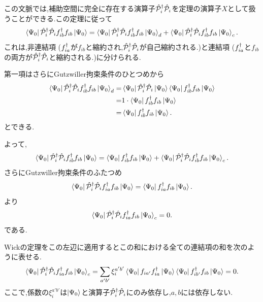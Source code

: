 この文脈では,補助空間に完全に存在する演算子$\hat{\mathcal{P}}^\dagger_{i}\hat{\mathcal{P}}_{i}$を定理の演算子$X$として扱うことができる.この定理に従って
\begin{equation}
    \Bra{\Psi_{0}}\hat{\mathcal{P}}^\dagger_{i}\hat{\mathcal{P}}_{i}f^\dagger_{ib}f_{ib}\Ket{\Psi_{0}}=\Bra{\Psi_{0}}\hat{\mathcal{P}}^\dagger_{i}\hat{\mathcal{P}}_{i}f^\dagger_{ib}f_{ib}\Ket{\Psi_{0}}_{d}+\Bra{\Psi_{0}}\hat{\mathcal{P}}^\dagger_{i}\hat{\mathcal{P}}_{i}f^\dagger_{ib}f_{ib}\Ket{\Psi_{0}}_{c}.
\end{equation}
これは,非連結項 ($f^\dagger_{ia}$が$f_{ib}$と縮約され,$\hat{\mathcal{P}}^\dagger_{i}\hat{\mathcal{P}}_{i}$が自己縮約される.)と連結項 ($f^\dagger_{ia}$と$f_{ib}$の両方が$\hat{\mathcal{P}}^\dagger_{i}\hat{\mathcal{P}}_{i}$と縮約される.)に分けられる.

第一項はさらにGutzwiller拘束条件のひとつめから
\begin{equation}
\begin{split}
    \Bra{\Psi_{0}}\hat{\mathcal{P}}^\dagger_{i}\hat{\mathcal{P}}_{i}f^\dagger_{ib}f_{ib}\Ket{\Psi_{0}}_{d}=& \Bra{\Psi_{0}}\hat{\mathcal{P}}^\dagger_{i}\hat{\mathcal{P}}_{i}\Ket{\Psi_{0}}\Bra{\Psi_{0}}f^\dagger_{ib}f_{ib}\Ket{\Psi_{0}}\\
    =&1\cdot \Bra{\Psi_{0}}f^\dagger_{ib}f_{ib}\Ket{\Psi_{0}}\\
    =&\Bra{\Psi_{0}}f^\dagger_{ib}f_{ib}\Ket{\Psi_{0}}.
\end{split}
\end{equation}
とできる.

よって,
\begin{equation}
     \Bra{\Psi_{0}}\hat{\mathcal{P}}^\dagger_{i}\hat{\mathcal{P}}_{i}f^\dagger_{ib}f_{ib}\Ket{\Psi_{0}}= \Bra{\Psi_{0}}f^\dagger_{ib}f_{ib}\Ket{\Psi_{0}}+ \Bra{\Psi_{0}}\hat{\mathcal{P}}^\dagger_{i}\hat{\mathcal{P}}_{i}f^\dagger_{ib}f_{ib}\Ket{\Psi_{0}}_{c}.
\end{equation}
さらにGutzwiller拘束条件のふたつめ
\begin{equation}
    \Bra{\Psi_{0}}\hat{\mathcal{P}}^\dagger_{i}\hat{\mathcal{P}}_{i}f^\dagger_{ia}f_{ib}\Ket{\Psi_{0}}
    =\Bra{\Psi_{0}}f^\dagger_{ia}f_{ib}\Ket{\Psi_{0}}.
\end{equation}
より
\begin{equation}
    \Bra{\Psi_{0}}\hat{\mathcal{P}}^\dagger_{i}\hat{\mathcal{P}}_{i}f^\dagger_{ia}f_{ib}\Ket{\Psi_{0}}_{c}
    =0.
\end{equation}
である.

Wickの定理をこの左辺に適用するとこの和における全ての連結項の和を次のように表せる.
\begin{equation}
    \Bra{\Psi_{0}}\hat{\mathcal{P}}^\dagger_{i}\hat{\mathcal{P}}_{i}f^\dagger_{ia}f_{ib}\Ket{\Psi_{0}}_{c}=\sum_{a'b'}\xi^{a'b'}_{i}\Bra{\Psi_{0}}f_{ia'}f^\dagger_{ia}\Ket{\Psi_{0}}\Bra{\Psi_{0}}f^\dagger_{ib'}f_{ib}\Ket{\Psi_{0}}=0. \label{sum-xi-1}
\end{equation}
ここで,係数の$\xi^{a'b'}_{i}$は$\Ket{\Psi_{0}}$と演算子$\hat{\mathcal{P}}^\dagger_{i}\hat{\mathcal{P}}_{i}$にのみ依存し,$a,b$には依存しない.

